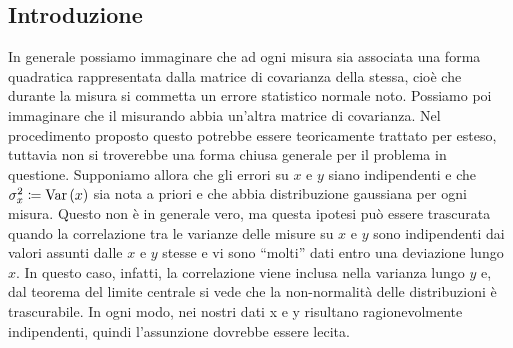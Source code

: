 \documentclass{article}[a4paper, oneside, 11pt]
\begin{document}
\subsection{Introduzione}
In generale possiamo immaginare che ad ogni misura sia associata una forma
quadratica rappresentata dalla matrice di covarianza della stessa, cioè che
durante la misura si commetta un errore statistico normale noto. Possiamo poi
immaginare che il misurando abbia un’altra matrice di covarianza. Nel
procedimento proposto questo potrebbe essere teoricamente trattato per esteso,
tuttavia non si troverebbe una forma chiusa generale per il problema in
questione. Supponiamo allora che gli errori su $x$ e $y$ siano indipendenti
e che $\sigma_x ^2 \coloneqq \text{Var}\left(x\right)$ sia nota a priori e che abbia 
distribuzione gaussiana per ogni misura. Questo non è in generale vero, ma 
questa ipotesi può essere trascurata quando la correlazione tra le varianze
delle misure su $x$ e $y$ sono indipendenti dai valori assunti dalle $x$ e $y$
stesse e vi sono “molti” dati entro una deviazione lungo $x$. In questo caso,
infatti, la correlazione viene inclusa nella varianza lungo $y$ e, dal
teorema del limite centrale si vede che la non-normalità delle distribuzioni
è trascurabile.
In ogni modo, nei nostri dati x e y risultano ragionevolmente indipendenti,
quindi l'assunzione dovrebbe essere lecita.
\end{document}
